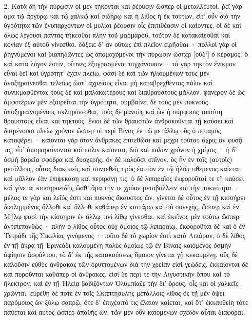 \documentclass[a4paper, 11pt, oneside, polutonikogreek, german]{article}
\begin{document}
2. Κατὰ δὴ τὴν πύρωσιν οἱ μὲν τήκονται καὶ ῥέουσιν ὥσπερ οἱ μεταλλευτοί. ῥεῖ γὰρ ἅμα τῷ ἀργύρῳ καὶ τῷ χαλκῷ καὶ σιδήρῳ καὶ ἡ λίθος ἡ ἐκ τούτων, εἴτ' οὖν διὰ τὴν ὑγρότητα τῶν ἐνυπαρχόντων οἱ μυλίαι ῥέουσιν οἷς ἐπιτιθέασιν οἱ καίοντες. οἱ δὲ καὶ ὅλως λέγουσι πάντας τήκεσθαι πλὴν τοῦ μαρμάρου, τοῦτον δὲ κατακαίεσθαι καὶ κονίαν ἐξ αὐτοῦ γίνεσθαι. δόξειε δ' ἂν οὕτως ἐπὶ πλεῖον εἰρῆσθαι · πολλοὶ γὰρ οἱ ῥηγνύμενοι καὶ διαπηδῶντες ὡς ἀπομαχόμενοι τὴν πύρωσιν ὥσπερ [οὐδ'] ὁ κέραμος. ὃ καὶ κατὰ λόγον ἐστὶν, οἵτινες ἐξυγρασμένοι τυγχάνουσιν · τὸ γὰρ τηκτὸν ἔνικμον εἶναι δεῖ καὶ ὑγρότητ' ἔχειν πλείω. φασὶ δὲ καὶ τῶν ἡλιουμένων τοὺς μὲν ἀναξηραίνεσθαι τελείως ὥστ' ἀχρείους εἶναι μὴ καταβρεχθέντας πάλιν καὶ συνικμασθέντας τοὺς δὲ καὶ μαλακωτέρους καὶ διαθραύστους μᾶλλον. φανερὸν δὲ ὡς ἀμφοτέρων μὲν ἐξαιρεῖται τὴν ὑγρότητα, συμβαίνει δὲ τοὺς μὲν πυκνοὺς ἀποξηραινομένους σκληρύνεσθαι, τοὺς δὲ μανοὺς καὶ ὧν ἡ σύμφυσις τοιαύτη θραυστοὺς εἶναι καὶ τηκτούς. ἔνιοι δὲ τῶν θραυστῶν ἀνθρακοῦνται τῇ καύσει καὶ διαμένουσι πλείω χρόνον ὥσπερ οἱ περὶ Βίνας ἐν τῷ μετάλλῳ οὓς ὁ ποταμὸς καταφέρει · καίονται γὰρ ὅταν ἄνθρακες ἐπιτεθῶσι καὶ μέχρι τούτου ἄχρις ἂν φυσᾷ τις, εἶτ' ἀπομαραίνονται καὶ πάλιν καίονται, διὸ καὶ πολὺν χρόνον ἡ χρῆσις · ἡ δ' ὀσμὴ βαρεῖα σφόδρα καὶ δυσχερής. ὃν δὲ καλοῦσι σπῖνον, ὃς ἦν ἐν τοῖς (αὐτοῖς) μετάλλοις, οὗτος διακοπεὶς καὶ συντεθεὶς πρὸς ἑαυτὸν ἐν τῷ ἡλίῳ τιθέμενος καίεται, καὶ μᾶλλον ἐὰν ἐπιψεκάσῃ καὶ περιράνῃ τις. ὁ δὲ λιπαραῖος ἐκφοροῦταί τε τῇ καύσει καὶ γίνεται κισσηροειδὴς ὥσθ' ἅμα τήν τε χρόαν μεταβάλλειν καὶ τὴν πυκνότητα · μέλας τε γὰρ καὶ λεῖός ἐστι καὶ πυκνὸς ἄκαυστος ὤν. γίνεται δὲ οὗτος ἐν τῇ κισσήρει διειλημμένος ἄλλοθι καὶ ἄλλοθι καθάπερ ἐν κυττάρῳ καὶ οὐ συνεχὴς, ὥσπερ καὶ ἐν Μήλῳ φασὶ τὴν κίσσηριν ἐν ἄλλῳ τινὶ λίθῳ γίνεσθαι. καὶ ἐκεῖνος μὲν τούτῳ ὥσπερ ἀντιπεπονθώς · πλὴν ὁ λίθος οὗτος οὐχ ὅμοιος τῷ λιπαραίῳ. ἐκφοροῦται δὲ καὶ ὁ ἐν Τετράδι τῆς Σικελίας γινόμενος · τοῦτο δὲ τὸ χωρίον ἐστὶ κατὰ Λιπάραν, ὁ δὲ λίθος ἐν τῇ ἄκρᾳ τῇ Ἐρινεάδι καλουμένῃ πολὺς ὁμοίως τῷ ἐν Βίναις καιόμενος ὀσμὴν ἀφίησιν ἀσφάλτου, τὸ δ' ἐκ τῆς κατακαύσεως ὅμοιον γίνεται γῇ κεκαυμένῃ. οὓς δὲ καλοῦσιν εὐθὺς ἄνθρακας τῶν ὀρυττομένων διὰ τὴν χρείαν εἰσὶ γεώδεις, ἐκκαίονται δὲ καὶ πυροῦνται καθάπερ οἱ ἄνθρακες. εἰσὶ δὲ περί τε τὴν Λιγυστικὴν ὅπου καὶ τὸ ἤλεκτρον, καὶ ἐν τῇ Ἠλείᾳ βαδιζόντων Ὀλυμπίαζε τὴν δι' ὄρους, οἷς καὶ οἱ χαλκεῖς χρῶνται. εὑρέθη δέ ποτε ἐν τοῖς Σκαπτησύλης μετάλλοις λίθος ὃς τῇ μὲν ὄψει παρόμοιος ὢν ξύλῳ σαπρῷ, ὅτε δ' ἐπιχέοιτό τις ἔλαιον καίεται, καὶ ὅτ' ἐκκαυθείη τότε παύεται καὶ αὐτὸς ὥσπερ ἀπαθὴς ὤν. τῶν μὲν οὖν καιομένων σχεδὸν αὗται διαφοραί.
\end{document}
